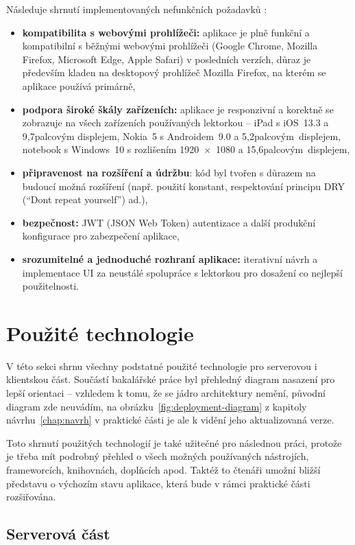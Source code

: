 Následuje shrnutí implementovaných nefunkčních požadavků \cite{bp}:
\begin{itemize}
    \item \textbf{kompatibilita s webovými prohlížeči:} aplikace je plně funkční a kompatibilní s běžnými webovými prohlížeči (Google Chrome, Mozilla Firefox, Microsoft Edge, Apple Safari) v posledních verzích, důraz je především kladen na desktopový prohlížeč Mozilla Firefox, na kterém se aplikace používá primárně,
    \item \textbf{podpora široké škály zařízeních:} aplikace je responzivní a korektně se zobrazuje na všech zařízeních používaných lektorkou -- iPad s iOS~13.3 a 9,7palcovým displejem, Nokia~5 s Androidem~9.0 a 5,2palcovým~displejem, notebook s Windows~10 s rozlišením 1920~×~1080 a 15,6palcovým~displejem,
    \item \textbf{připravenost na rozšíření a údržbu}: kód byl tvořen s důrazem na budoucí možná rozšíření (např. použití konstant, respektování principu DRY (\enquote{Don\textquotesingle t repeat yourself}) ad.),
    \item \textbf{bezpečnost:} JWT (JSON Web Token) autentizace a další produkční konfigurace pro zabezpečení aplikace,
    \item \textbf{srozumitelné a jednoduché rozhraní aplikace:} iterativní návrh a implementace UI za neustálé spolupráce s lektorkou pro dosažení co nejlepší použitelnosti.
\end{itemize}


\section{Použité technologie}

V této sekci shrnu všechny podstatné použité technologie pro serverovou i klientskou část. Součástí bakalářské práce byl přehledný diagram nasazení pro lepší orientaci \cite{bp} -- vzhledem k tomu, že se jádro architektury nemění, původní diagram zde neuvádím, na obrázku~\ref{fig:deployment-diagram} z kapitoly návrhu~\ref{chap:navrh} v praktické části je ale k vidění jeho aktualizovaná verze.

Toto shrnutí použitých technologií je také užitečné pro následnou práci, protože je třeba mít podrobný přehled o všech možných používaných nástrojích, frameworcích, knihovnách, doplňcích apod. Taktéž to čtenáři umožní bližší představu o výchozím stavu aplikace, která bude v rámci praktické části rozšiřována.

\subsection{Serverová část}

